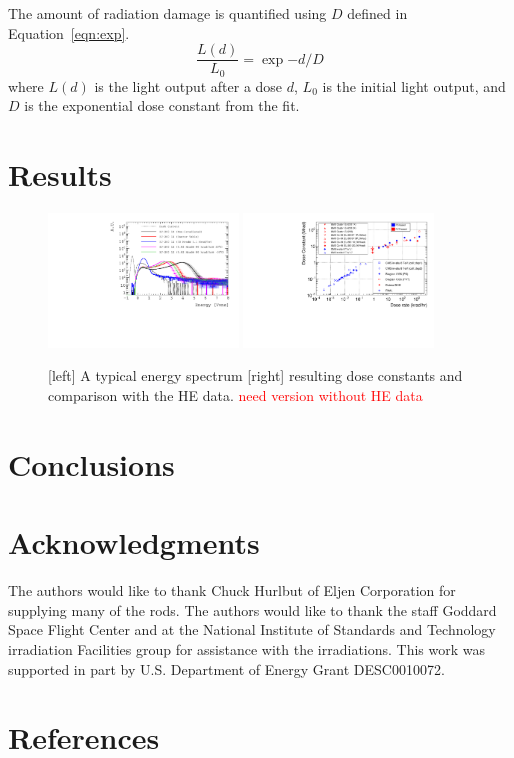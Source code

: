 \documentclass[review]{elsarticle}
\begin{document}
The amount of radiation damage is quantified 
using $D$ defined in Equation~\ref{eqn:exp}.
\begin{equation}
\frac{L(d)}{L_0}=\exp{-d/D}
\label{eqn:exp}
\end{equation}
where $L(d)$ is the light output after a dose $d$, $L_0$ is the initial light
output, and $D$ is the exponential dose constant from the fit.


\section{Results}


\begin{figure}[hbtp]
\centering
\includegraphics[width=0.45\textwidth]{AlphaSourceMeasurement-EJ200OLD_nominal.pdf}
\includegraphics[width=0.45\textwidth]{DoseConstVsDoseRate}
    \caption{
[left] A typical energy spectrum 
[right] resulting dose constants and comparison with the HE data. \textcolor{red}{need version without HE data}
    }
    \label{fig:GY_more2}
\end{figure}




\section{Conclusions}

\section{Acknowledgments}
The authors would like to thank Chuck Hurlbut of Eljen Corporation for supplying many of the rods.
The authors would like to thank the staff
Goddard Space Flight Center and at the National Institute of Standards and Technology irradiation
Facilities group for assistance
with the irradiations. 
This work was supported in part by U.S. Department of Energy Grant DESC0010072.

\section*{References}


\end{document}
